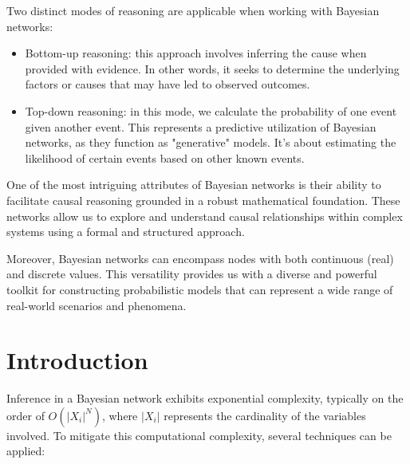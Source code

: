 \documentclass[12pt, a4paper]{report}
\begin{document}
    Two distinct modes of reasoning are applicable when working with Bayesian networks:
    \begin{itemize}
        \item Bottom-up reasoning: this approach involves inferring the cause when provided with evidence. 
            In other words, it seeks to determine the underlying factors or causes that may have led to observed outcomes.
        \item Top-down reasoning: in this mode, we calculate the probability of one event given another event. 
            This represents a predictive utilization of Bayesian networks, as they function as "generative" models. 
            It's about estimating the likelihood of certain events based on other known events.
    \end{itemize}
    One of the most intriguing attributes of Bayesian networks is their ability to facilitate causal reasoning grounded in a robust mathematical foundation. 
    These networks allow us to explore and understand causal relationships within complex systems using a formal and structured approach.

    Moreover, Bayesian networks can encompass nodes with both continuous (real) and discrete values. 
    This versatility provides us with a diverse and powerful toolkit for constructing probabilistic models that can represent a wide range of real-world scenarios and phenomena.

    \section{Introduction}
    Inference in a Bayesian network exhibits exponential complexity, typically on the order of $O(\left\lvert X_i \right\rvert^N)$, where $\left\lvert X_i \right\rvert$ represents the cardinality of the variables involved. 
    To mitigate this computational complexity, several techniques can be applied:
\end{document}

